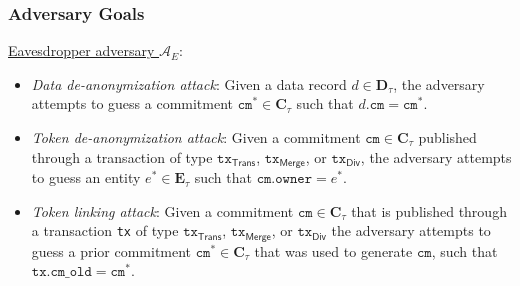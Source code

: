 %	


\subsubsection{Adversary Goals}\label{sec:adv_goals}
\noindent \underline{Eavesdropper adversary  $\mathcal{A}_E$}:
\begin{itemize}
    \item \textit{Data de-anonymization attack}: Given a data record $d \in \mathbf{D}_\tau$, the adversary attempts to guess a commitment $\texttt{cm}^* \in \mathbf{C}_\tau$ such that $d.\texttt{cm} = \texttt{cm}^*$.
	\item \textit{Token de-anonymization attack}: Given a commitment $\texttt{cm} \in \mathbf{C}_\tau$ published through a transaction of type $\texttt{tx}_\textsf{Trans}$, $\texttt{tx}_\textsf{Merge}$, or $\texttt{tx}_\textsf{Div}$, the adversary attempts to guess an entity $e^* \in \mathbf{E}_\tau$ such that $\texttt{cm}.\texttt{owner} = e^*$.
	\item \textit{Token linking attack}: Given a commitment $\texttt{cm} \in \mathbf{C}_\tau$ that is published through a transaction \texttt{tx} of type $\texttt{tx}_\textsf{Trans}$, $\texttt{tx}_\textsf{Merge}$, or $\texttt{tx}_\textsf{Div}$ 
	 the adversary attempts to guess a prior commitment $\texttt{cm}^* \in \mathbf{C}_\tau$ that was used to generate $\texttt{cm}$, such that $\texttt{tx}.\texttt{cm\_old} = \texttt{cm}^*$.
\end{itemize}

